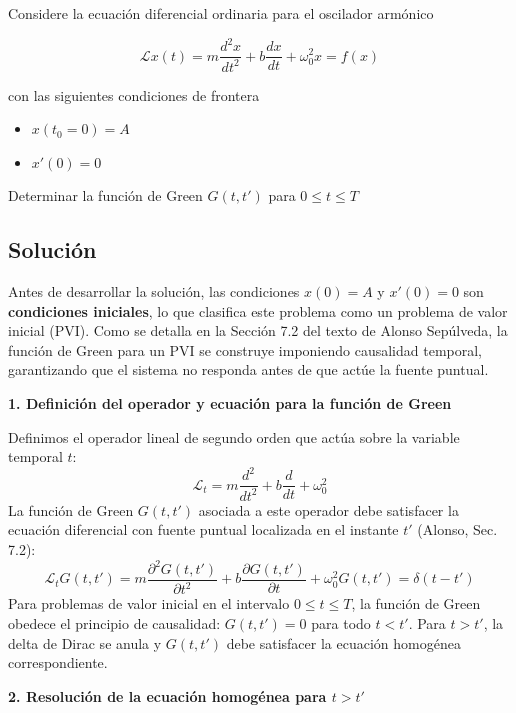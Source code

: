 \documentclass[a4paper]{article}
\begin{document}
Considere la ecuación diferencial ordinaria para el oscilador armónico

$$\mathscr{L} x(t) = m\frac{d^2 x}{dt^2} + b \frac{dx}{dt} + \omega_0^2x = f(x)$$

con las siguientes condiciones de frontera

\begin{itemize}
	\item $x(t_0=0) = A$
	\item $x'(0) = 0$
\end{itemize}

Determinar la función de Green $G(t, t')$ para $0\leq t\leq T$


\subsection{Solución}

Antes de desarrollar la solución, las condiciones $x(0)=A$ y $x'(0)=0$ son \textbf{condiciones iniciales}, lo que clasifica este problema como un problema de valor inicial (PVI). Como se detalla en la Sección 7.2 del texto de Alonso Sepúlveda, la función de Green para un PVI se construye imponiendo causalidad temporal, garantizando que el sistema no responda antes de que actúe la fuente puntual.

\textbf{1. Definición del operador y ecuación para la función de Green}

Definimos el operador lineal de segundo orden que actúa sobre la variable temporal $t$:
$$ \mathscr{L}_t = m \frac{d^2}{dt^2} + b \frac{d}{dt} + \omega_0^2 $$
La función de Green $G(t, t')$ asociada a este operador debe satisfacer la ecuación diferencial con fuente puntual localizada en el instante $t'$ (Alonso, Sec. 7.2):
$$ \mathscr{L}_t G(t, t') = m \frac{\partial^2 G(t, t')}{\partial t^2} + b \frac{\partial G(t, t')}{\partial t} + \omega_0^2 G(t, t') = \delta(t - t') $$
Para problemas de valor inicial en el intervalo $0 \leq t \leq T$, la función de Green obedece el principio de causalidad: $G(t, t') = 0$ para todo $t < t'$. Para $t > t'$, la delta de Dirac se anula y $G(t, t')$ debe satisfacer la ecuación homogénea correspondiente.

\textbf{2. Resolución de la ecuación homogénea para $t > t'$}
\end{document}
